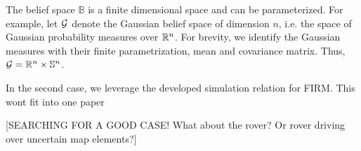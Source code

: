 \documentclass{ifacconf}
\newcommand{\red}[1]{{\color{red} #1}}
\begin{document}
 
The belief space $\mathbb{B}$ is  a finite dimensional space and can be parameterized. For example, let $\mathcal{G}$ denote the Gaussian belief space
    of dimension $n$, i.e. the space of Gaussian
    probability measures over $\mathbb{R}^n$.
    For brevity, we identify the Gaussian measures
    with their finite parametrization, mean and
    covariance matrix.
     Thus,
    $\mathcal{G} =  \mathbb{R}^n \times  \mathbb S^n$.
    
    
 
 In the second case, we leverage the developed simulation relation for FIRM. \red{This wont fit into one paper}
 
 \red{[SEARCHING FOR A GOOD CASE! What about the rover? Or rover driving over uncertain map elements?]}





\end{document}
